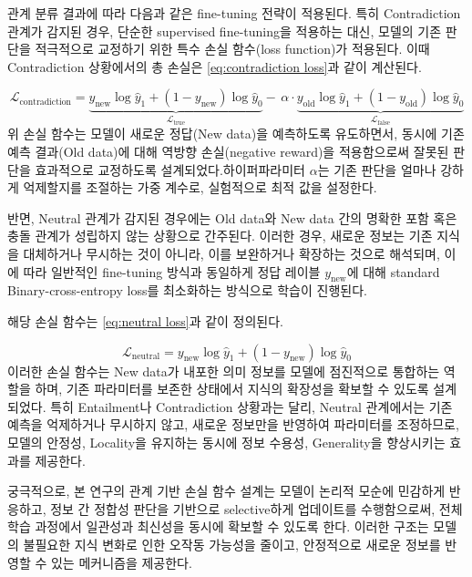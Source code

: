 \documentclass[a4paper,fleqn]{cas-sc}
\begin{document}
관계 분류 결과에 따라 다음과 같은 fine-tuning 전략이 적용된다. 특히 Contradiction 관계가 감지된 경우, 단순한 supervised fine-tuning을 적용하는 대신, 모델의 기존 판단을 적극적으로 교정하기 위한 특수 손실 함수(loss function)가 적용된다. 이때 Contradiction 상황에서의 총 손실은 \cref{eq:contradiction loss}과 같이 계산된다.

    

\begin{equation}
    \mathcal{L}_{\text{contradiction}} =
    \underbrace{y_{\text{new}} \log \hat{y}_1 + (1 - y_{\text{new}}) \log \hat{y}_0 }_{\mathcal{L}_{\text{true}}}
    -\, \alpha \cdot
    \underbrace{ y_{\text{old}} \log \hat{y}_1 + (1 - y_{\text{old}}) \log \hat{y}_0 }_{\mathcal{L}_{\text{false}}}
    \label{eq:contradiction loss}
\end{equation}
위 손실 함수는 모델이 새로운 정답(New data)을 예측하도록 유도하면서, 동시에 기존 예측 결과(Old data)에 대해 역방향 손실(negative reward)을 적용함으로써 잘못된 판단을 효과적으로 교정하도록 설계되었다.하이퍼파라미터 $α$는 기존 판단을 얼마나 강하게 억제할지를 조절하는 가중 계수로, 실험적으로 최적 값을 설정한다.
        
반면, Neutral 관계가 감지된 경우에는 Old data와 New data 간의 명확한 포함 혹은 충돌 관계가 성립하지 않는 상황으로 간주된다. 이러한 경우, 새로운 정보는 기존 지식을 대체하거나 무시하는 것이 아니라, 이를 보완하거나 확장하는 것으로 해석되며, 이에 따라 일반적인 fine-tuning 방식과 동일하게 정답 레이블 \( y_{\text{new}} \)​에 대해 standard Binary-cross-entropy loss를 최소화하는 방식으로 학습이 진행된다.

해당 손실 함수는 \cref{eq:neutral loss}과 같이 정의된다.

\begin{equation}
    \mathcal{L}_{\text{neutral}} = {y_{\text{new}} \log \hat{y}_1 + (1 - y_{\text{new}}) \log \hat{y}_0}
    \label{eq:neutral loss}
\end{equation}
이러한 손실 함수는 New data가 내포한 의미 정보를 모델에 점진적으로 통합하는 역할을 하며, 기존 파라미터를 보존한 상태에서 지식의 확장성을 확보할 수 있도록 설계되었다. 특히 Entailment나 Contradiction 상황과는 달리, Neutral 관계에서는 기존 예측을 억제하거나 무시하지 않고, 새로운 정보만을 반영하여 파라미터를 조정하므로, 모델의 안정성, Locality을 유지하는 동시에 정보 수용성, Generality을 향상시키는 효과를 제공한다.

궁극적으로, 본 연구의 관계 기반 손실 함수 설계는 모델이 논리적 모순에 민감하게 반응하고, 정보 간 정합성 판단을 기반으로 selective하게 업데이트를 수행함으로써, 전체 학습 과정에서 일관성과 최신성을 동시에 확보할 수 있도록 한다. 이러한 구조는 모델의 불필요한 지식 변화로 인한 오작동 가능성을 줄이고, 안정적으로 새로운 정보를 반영할 수 있는 메커니즘을 제공한다.
\end{document}
